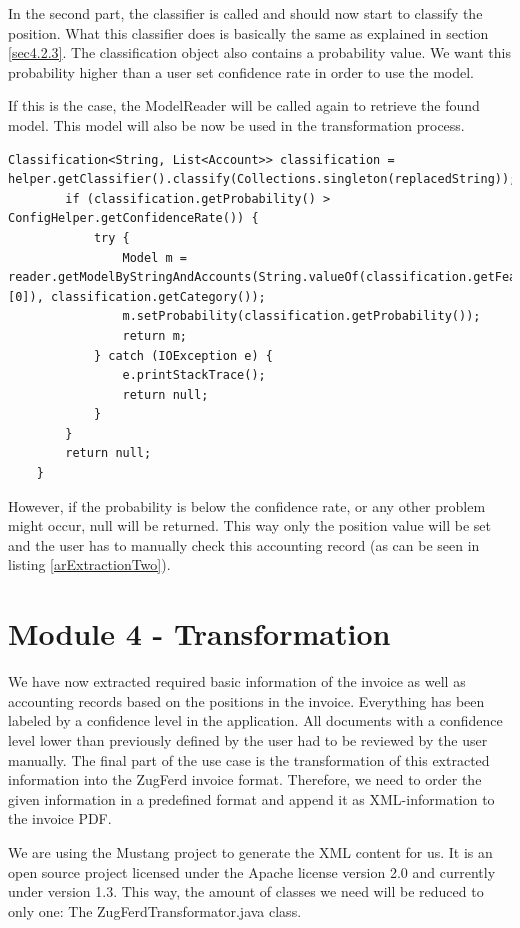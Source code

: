 In the second part, the classifier is called and should now start to classify the position. What this classifier does is basically the same as explained in section \ref{sec4.2.3}. The classification object also contains a probability value. We want this probability higher than a user set confidence rate in order to use the model.

If  this is the case, the ModelReader will be called again to retrieve the found model. This model will also be now be used in the transformation process. 

\begin{lstlisting}[caption={Classification of a position}]
        Classification<String, List<Account>> classification = helper.getClassifier().classify(Collections.singleton(replacedString));
        if (classification.getProbability() > ConfigHelper.getConfidenceRate()) {
            try {
                Model m = reader.getModelByStringAndAccounts(String.valueOf(classification.getFeatureset().toArray()[0]), classification.getCategory());
                m.setProbability(classification.getProbability());
                return m;
            } catch (IOException e) {
                e.printStackTrace();
                return null;
            }
        }
        return null;
    }
\end{lstlisting}

However, if the probability is below the confidence rate, or any other problem might occur, null will be returned. This way only the position value will be set and the user has to manually check this accounting record (as can be seen in listing \ref{arExtractionTwo}).
    
\section{Module 4 - Transformation}
\label{sec5.7}

We have now extracted required basic information of the invoice as well as accounting records based on the positions in the invoice. Everything has been labeled by a confidence level in the application. All documents with a confidence level lower than previously defined by the user had to be reviewed by the user manually.
The final part of the use case is the transformation of this extracted information into the ZugFerd invoice format. Therefore, we need to order the given information in a predefined format and append it as XML-information to the invoice PDF.

We are using the Mustang project to generate the XML content for us. It is an open source project licensed under the Apache license version 2.0 and currently under version 1.3. This way, the amount of classes we need will be reduced to only one: The ZugFerdTransformator.java class.

